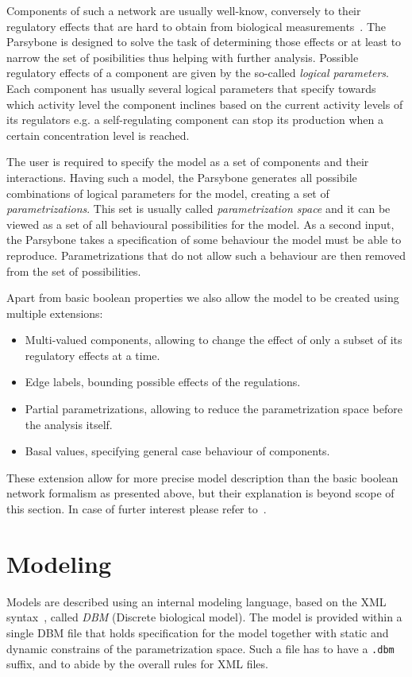 \documentclass[12pt]{article}
\begin{document}
Components of such a network are usually well-know, conversely to their regulatory effects that are hard to obtain from biological measurements~\cite{Hecker09}. The Parsybone is designed to solve the task of determining those effects or at least to narrow the set of posibilities thus helping with further analysis. Possible regulatory effects of a component are given by the so-called \emph{logical parameters}. Each component has usually several logical parameters that specify towards which activity level the component inclines based on the current activity levels of its regulators e.g. a self-regulating component can stop its production when a certain concentration level is reached.

The user is required to specify the model as a set of components and their interactions. Having such a model, the Parsybone generates all possibile combinations of logical parameters for the model, creating a set of \emph{parametrizations}. This set is usually called \emph{parametrization space} and it can be viewed as a set of all behavioural possibilities for the model. As a second input, the Parsybone takes a specification of some behaviour the model must be able to reproduce. Parametrizations that do not allow such a behaviour are then removed from the set of possibilities.

Apart from basic boolean properties we also allow the model to be created using multiple extensions:
\begin{itemize}
\item Multi-valued components, allowing to change the effect of only a subset of its regulatory effects at a time.
\item Edge labels, bounding possible effects of the regulations.
\item Partial parametrizations, allowing to reduce the parametrization space before the analysis itself.
\item Basal values, specifying general case behaviour of components.
\end{itemize}

These extension allow for more precise model description than the basic boolean network formalism as presented above, but their explanation is beyond scope of this section. In case of furter interest please refer to~\cite{TechReport}.

\section{Modeling}
\label{sec:modeling}
 Models are described using an internal modeling language, based on the XML syntax~\cite{XML}, called \emph{DBM} (Discrete biological model). The model is provided within a single DBM file that holds specification for the model together with static and dynamic constrains of the parametrization space. Such a file has to have a \texttt{.dbm} suffix, and to abide by the overall rules for XML files.
\end{document}
